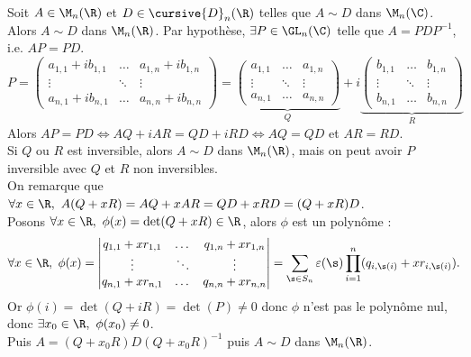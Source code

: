 \documentclass[11pt]{article}
\renewcommand*{\D}{\cursive{D}}
\begin{document}
\pagebreak

\begin{exercice}{}{}
    Soit $A\in\M_n(\R)$ et $D\in\D_n(\R)$ telles que $A\sim D$ dans $\M_n(\C)$.\\
    Alors $A\sim D$ dans $\M_n(\R)$.
    \tcblower
    Par hypothèse, $\exists P \in \GL_n(\C)$ telle que $A=PDP^{-1}$, i.e. $AP=PD$.
    \begin{equation*}
        P=\begin{pmatrix}
          a_{1,1} + i b_{1,1} & \dots & a_{1,n} + i b_{1,n} \\
            \vdots & \ddots & \vdots \\
            a_{n,1} + i b_{n,1} & \dots & a_{n,n} + i b_{n,n}  
        \end{pmatrix} = \underbrace{\begin{pmatrix}
            a_{1,1} & \dots & a_{1,n} \\
            \vdots & \ddots & \vdots \\
            a_{n,1} & \dots & a_{n,n}
        \end{pmatrix}}_{Q} + i\underbrace{\begin{pmatrix}
            b_{1,1} & \dots & b_{1,n} \\
            \vdots & \ddots & \vdots \\
            b_{n,1} & \dots & b_{n,n}
        \end{pmatrix}}_{R}
    \end{equation*}
    Alors $AP=PD\iff AQ+iAR=QD+iRD\iff AQ=QD$ et $AR=RD$.\\
    Si $Q$ ou $R$ est inversible, alors $A\sim D$ dans $\M_n(\R)$, mais on peut avoir $P$ inversible avec $Q$ et $R$ non inversibles.\\
    On remarque que $\forall x \in \R, ~ A(Q+xR)=AQ+xAR=QD+xRD=(Q+xR)D$.\\
    Posons $\forall x \in \R, ~ \phi(x)=\det(Q+xR)\in\R$, alors $\phi$ est un polynôme :
    \begin{equation*}
        \forall x \in \R, ~ \phi(x)=\begin{vmatrix}
            q_{1,1}+x r_{1,1} & \dots & q_{1,n}+x r_{1,n} \\
            \vdots & \ddots & \vdots \\
            q_{n,1}+x r_{n,1} & \dots & q_{n,n}+x r_{n,n}
        \end{vmatrix} = \sum_{\s\in S_n} \varepsilon(\s) \prod_{i=1}^n (q_{i,\s(i)}+x r_{i,\s(i)}).
    \end{equation*}
    Or $\phi(i)=\det(Q+iR)=\det(P)\neq0$ donc $\phi$ n'est pas le polynôme nul, donc $\exists x_0 \in \R, ~ \phi(x_0)\neq0$.\\
    Puis $A=(Q+x_0R)D(Q+x_0R)^{-1}$ puis $A\sim D$ dans $\M_n(\R)$.
\end{exercice}
\end{document}
